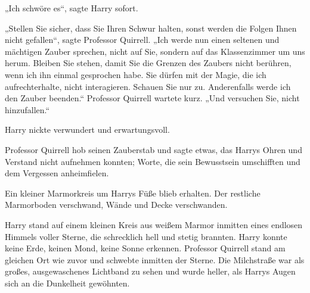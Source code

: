 „Ich schwöre es“, sagte Harry sofort.

„Stellen Sie sicher, dass Sie Ihren Schwur halten, sonst werden die Folgen Ihnen nicht gefallen“, sagte Professor Quirrell. „Ich werde nun einen seltenen und mächtigen Zauber sprechen, nicht auf Sie, sondern auf das Klassenzimmer um uns herum. Bleiben Sie stehen, damit Sie die Grenzen des Zaubers nicht berühren, wenn ich ihn einmal gesprochen habe. Sie dürfen mit der Magie, die ich aufrechterhalte, nicht interagieren. Schauen Sie nur zu. Anderenfalls werde ich den Zauber beenden.“ Professor Quirrell wartete kurz. „Und versuchen Sie, nicht hinzufallen.“

Harry nickte verwundert und erwartungsvoll.

Professor Quirrell hob seinen Zauberstab und sagte etwas, das Harrys Ohren und Verstand nicht aufnehmen konnten; Worte, die sein Bewusstsein umschifften und dem Vergessen anheimfielen.

Ein kleiner Marmorkreis um Harrys Füße blieb erhalten. Der restliche Marmorboden verschwand, Wände und Decke verschwanden.

Harry stand auf einem kleinen Kreis aus weißem Marmor inmitten eines endlosen Himmels voller Sterne, die schrecklich hell und stetig brannten. Harry konnte keine Erde, keinen Mond, keine Sonne erkennen. Professor Quirrell stand am gleichen Ort wie zuvor und schwebte inmitten der Sterne. Die Milchstraße war als großes, ausgewaschenes Lichtband zu sehen und wurde heller, als Harrys Augen sich an die Dunkelheit gewöhnten.

